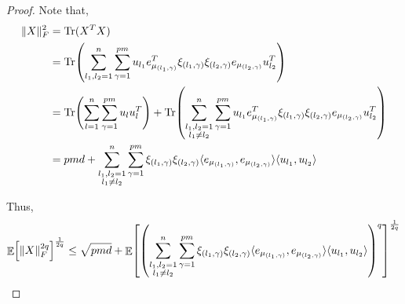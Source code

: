 \documentclass[11pt]{amsart}
\numberwithin{equation}{section}
\numberwithin{equation}{section}
\DeclareMathOperator{\E}{\mathbb{E}}
\DeclareMathOperator*{\Tr}{Tr}
\DeclarePairedDelimiter{\norm}{\lVert}{\rVert}
\DeclarePairedDelimiter{\ip}{\langle}{\rangle}
\DeclarePairedDelimiter{\paren}{(}{)}
\DeclarePairedDelimiter{\sqbr}{[}{]}
\begin{document}
\begin{proof}
    Note that,
    \begin{align*}
        \norm{X}^2_F &= \Tr (X^T X) \\
        &= \Tr \paren*{\sum_{l_1, l_2 =1}^n \sum_{\gamma=1}^{pm} u_{l_1}e_{\mu_{(l_1, \gamma)}}^T \xi_{(l_1, \gamma)} \xi_{(l_2, \gamma)} e_{\mu_{(l_2, \gamma)}} u_{l_2}^T } \\
        &= \Tr \paren*{\sum_{l =1}^n \sum_{\gamma=1}^{pm} u_{l} u_{l}^T } + \Tr \paren*{\sum_{\substack{l_1, l_2 =1 \\ l_1 \neq l_2}}^n \sum_{\gamma=1}^{pm} u_{l_1}e_{\mu_{(l_1, \gamma)}}^T \xi_{(l_1, \gamma)} \xi_{(l_2, \gamma)} e_{\mu_{(l_2, \gamma)}} u_{l_2}^T } \\
        &= pmd + \sum_{\substack{l_1, l_2 =1 \\ l_1 \neq l_2}}^n \sum_{\gamma=1}^{pm} \xi_{(l_1, \gamma)} \xi_{(l_2, \gamma)} \ip{e_{\mu_{(l_1, \gamma)}}, e_{\mu_{(l_2, \gamma)}}} \ip{u_{l_1}, u_{l_2}}  \\
    \end{align*}

    Thus, 
\[ \E \sqbr*{\norm{X}^{2q}_F}^\frac{1}{2q} \le \sqrt{pmd} + \E \sqbr*{ \paren*{\sum_{\substack{l_1, l_2 =1 \\ l_1 \neq l_2}}^n \sum_{\gamma=1}^{pm} \xi_{(l_1, \gamma)} \xi_{(l_2, \gamma)} \ip{e_{\mu_{(l_1, \gamma)}}, e_{\mu_{(l_2, \gamma)}}} \ip{u_{l_1}, u_{l_2}}}^q }^\frac{1}{2q} \]


\end{proof}
\end{document}
